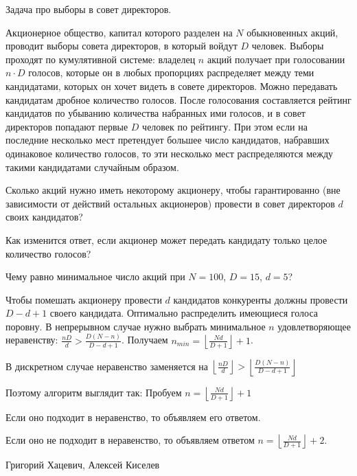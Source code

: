 \begin{problem}
 Задача про выборы в совет директоров.  \par
Акционерное общество, капитал которого разделен на $N$ обыкновенных акций, проводит выборы совета директоров, в который войдут $D$ человек. Выборы проходят по кумулятивной системе: владелец $n$ акций получает при голосовании $n\cdot D$ голосов, которые он в любых пропорциях распределяет между теми кандидатами, которых он хочет видеть в совете директоров. Можно передавать кандидатам дробное количество голосов. После голосования составляется рейтинг кандидатов по убыванию количества набранных ими голосов, и в совет директоров попадают первые $D$ человек по рейтингу. При этом если на последние несколько мест претендует большее число кандидатов, набравших одинаковое количество голосов, то эти несколько мест распределяются между такими кандидатами случайным образом. \par
Сколько акций нужно иметь некоторому акционеру, чтобы гарантированно (вне зависимости от действий остальных акционеров) провести в совет директоров $d$ своих кандидатов? \par
Как изменится ответ, если акционер может передать кандидату только целое количество голосов? \par
Чему равно минимальное число акций при $N=100$, $D=15$, $d=5$?



\begin{sol}

Чтобы помешать акционеру провести $d$ кандидатов конкуренты должны провести $D-d+1$ своего кандидата. Оптимально распределить имеющиеся голоса поровну.
В непрерывном случае нужно выбрать минимальное $n$ удовлетворяющее неравенству: $\frac{nD}{d}>\frac{D(N-n)}{D-d+1}$. Получаем $n_{min}= \left\lfloor \frac{Nd}{D+1}\right\rfloor+1$. \par
В дискретном случае неравенство заменяется на
$\left\lfloor \frac{nD}{d}\right\rfloor>\left\lfloor \frac{D(N-n)}{D-d+1}\right\rfloor$ \par
Поэтому алгоритм выглядит так:
Пробуем $n=\left\lfloor \frac{Nd}{D+1}\right\rfloor+1$ \par
Если оно подходит в неравенство, то объявляем его ответом. \par
Если оно не подходит в неравенство, то объявляем ответом $n=\left\lfloor \frac{Nd}{D+1}\right\rfloor+2$.
\end{sol}
\end{problem}


\begin{source}
Григорий Хацевич, Алексей Киселев
\end{source}




